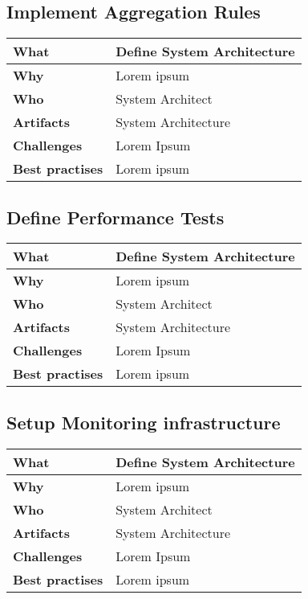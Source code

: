 \subsection{Implement Aggregation Rules}
 \label{table:ch6_Task_Define_System_Architect}
\begin{tabular}
	{|m{3cm}|m{10cm}|} \hline \bfseries What & Define System Architecture\\
	\hline \bfseries Why & Lorem ipsum\\
	\hline \bfseries Who & System Architect\\
	\hline \bfseries Artifacts & System Architecture\\
	\hline \bfseries Challenges & Lorem Ipsum\\
	\hline \bfseries Best practises & Lorem ipsum\\
	\hline 
\end{tabular}

\subsection{Define Performance Tests}
 \label{table:ch6_Task_Define_System_Architect}
\begin{tabular}
	{|m{3cm}|m{10cm}|} \hline \bfseries What & Define System Architecture\\
	\hline \bfseries Why & Lorem ipsum\\
	\hline \bfseries Who & System Architect\\
	\hline \bfseries Artifacts & System Architecture\\
	\hline \bfseries Challenges & Lorem Ipsum\\
	\hline \bfseries Best practises & Lorem ipsum\\
	\hline 
\end{tabular}

\subsection{Setup Monitoring infrastructure}
 \label{table:ch6_Task_Define_System_Architect}
\begin{tabular}
	{|m{3cm}|m{10cm}|} \hline \bfseries What & Define System Architecture\\
	\hline \bfseries Why & Lorem ipsum\\
	\hline \bfseries Who & System Architect\\
	\hline \bfseries Artifacts & System Architecture\\
	\hline \bfseries Challenges & Lorem Ipsum\\
	\hline \bfseries Best practises & Lorem ipsum\\
	\hline 
\end{tabular}

